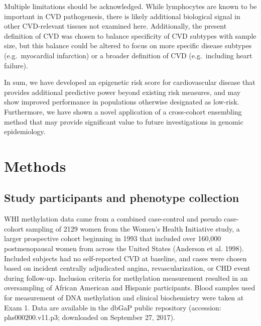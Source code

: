 \documentclass[]{article}
\begin{document}
Multiple limitations should be acknowledged. While lymphocytes are known
to be important in CVD pathogenesis, there is likely additional
biological signal in other CVD-relevant tissues not examined here.
Additionally, the present definition of CVD was chosen to balance
specificity of CVD subtypes with sample size, but this balance could be
altered to focus on more specific disease subtypes (e.g.~myocardial
infarction) or a broader definition of CVD (e.g.~including heart
failure).

In sum, we have developed an epigenetic risk score for cardiovascular
disease that provides additional predictive power beyond existing risk
measures, and may show improved performance in populations otherwise
designated as low-risk. Furthermore, we have shown a novel application
of a cross-cohort ensembling method that may provide significant value
to future investigations in genomic epidemiology.

\hypertarget{methods}{%
\section{Methods}\label{methods}}

\hypertarget{study-participants-and-phenotype-collection}{%
\subsection{Study participants and phenotype
collection}\label{study-participants-and-phenotype-collection}}

WHI methylation data came from a combined case-control and pseudo
case-cohort sampling of 2129 women from the Women's Health Initiative
study, a larger prospective cohort beginning in 1993 that included over
160,000 postmenopausal women from across the United States (Anderson et
al. 1998). Included subjects had no self-reported CVD at baseline, and
cases were chosen based on incident centrally adjudicated angina,
revascularization, or CHD event during follow-up. Inclusion criteria for
methylation measurement resulted in an oversampling of African American
and Hispanic participants. Blood samples used for measurement of DNA
methylation and clinical biochemistry were taken at Exam 1. Data are
available in the dbGaP public repository (accession: phs000200.v11.p3;
downloaded on September 27, 2017).
\end{document}
